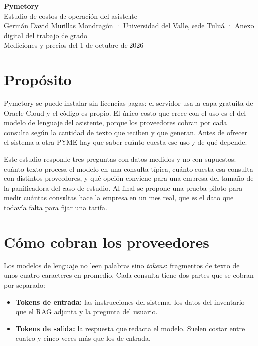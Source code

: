 \documentclass[letterpaper,11pt]{article}
\begin{document}
\begin{center}
{\LARGE\bfseries Pymetory}\\[4pt]
{\large Estudio de costos de operación del asistente}\\[4pt]
Germán David Murillas Mondragón · Universidad del Valle, sede Tuluá · Anexo digital del trabajo de grado\\
{\small Mediciones y precios del 1 de octubre de 2026}
\end{center}

\section{Propósito}

Pymetory se puede instalar sin licencias pagas: el servidor usa la capa gratuita de Oracle Cloud y el código es propio. El único costo que crece con el uso es el del modelo de lenguaje del asistente, porque los proveedores cobran por cada consulta según la cantidad de texto que reciben y que generan. Antes de ofrecer el sistema a otra PYME hay que saber cuánto cuesta ese uso y de qué depende.

Este estudio responde tres preguntas con datos medidos y no con supuestos: cuánto texto procesa el modelo en una consulta típica, cuánto cuesta esa consulta con distintos proveedores, y qué opción conviene para una empresa del tamaño de la panificadora del caso de estudio. Al final se propone una prueba piloto para medir cuántas consultas hace la empresa en un mes real, que es el dato que todavía falta para fijar una tarifa.

\section{Cómo cobran los proveedores}

Los modelos de lenguaje no leen palabras sino \emph{tokens}: fragmentos de texto de unos cuatro caracteres en promedio. Cada consulta tiene dos partes que se cobran por separado:

\begin{itemize}[nosep]
\item \textbf{Tokens de entrada:} las instrucciones del sistema, los datos del inventario que el RAG adjunta y la pregunta del usuario.
\item \textbf{Tokens de salida:} la respuesta que redacta el modelo. Suelen costar entre cuatro y cinco veces más que los de entrada.
\end{itemize}
\end{document}
